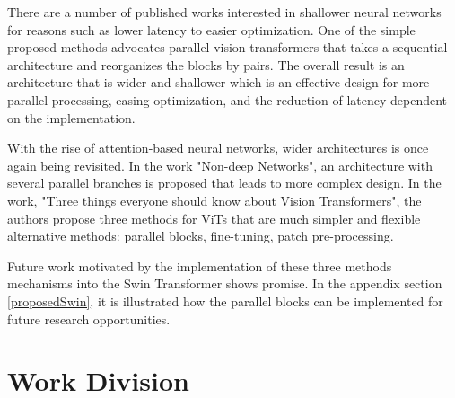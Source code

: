 \documentclass[10pt,twocolumn,letterpaper]{article}
\begin{document}
There are a number of published works interested in shallower neural networks\cite{goyal2021non}\cite{zagoruyko2016wide} for reasons such as lower latency to easier optimization. One of the simple proposed methods advocates parallel vision transformers\cite{touvron2022three} that takes a sequential architecture and reorganizes the blocks by pairs. The overall result is an architecture that is wider and shallower which is an effective design for more parallel processing, easing optimization, and the reduction of latency dependent on the implementation.

With the rise of attention-based neural networks, wider architectures is once again being revisited\cite{goyal2021non}. In the work "Non-deep Networks", an architecture with several parallel branches is proposed that leads to more complex design. In the work, "Three things everyone should know about Vision Transformers", the authors propose three methods for ViTs that are much simpler and flexible alternative methods: parallel blocks, fine-tuning, patch pre-processing\cite{touvron2022three}.

Future work motivated by the implementation of these three methods mechanisms into the Swin Transformer shows promise. In the appendix section \ref{proposedSwin}, it is illustrated how the parallel blocks can be implemented for future research opportunities.


\section{Work Division}

\begin{table}[h!]
\begin{center}
\end{center}
\caption{Contributions of team members.}
\label{tab:contributions}
\end{table}
\end{document}
